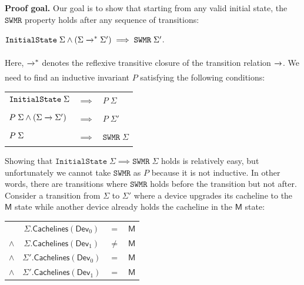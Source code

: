 \documentclass[10pt,conference]{IEEEtran}
\newcommand{\StateSymbol}{\Sigma}
\newcommand{\makestep}[2]{%
  \xrightarrow[%
    {\mathclap{\scriptscriptstyle
      \ifstrempty{#2}{}{#2}
    }}%
  ]{%
    {\mathclap{\scriptscriptstyle
      \ifstrempty{#1}{}{#1}
    }}%
  }%
}
\newcommand\SWMR{\texttt{SWMR}}
\newcommand\Modified{\STATE{M}}
\newcommand\STATE[1]{\textsf{#1}}
\begin{document}
\smallskip\noindent
\textbf{Proof goal.}
Our goal is to show that starting from any valid initial state, the $\SWMR$ property holds after any sequence of transitions:
\begin{center}
    $\texttt{InitialState} \; \StateSymbol{} \land (\StateSymbol{} \makestep{}{}^* \StateSymbol{}') \implies \SWMR\; \StateSymbol{}'$.
\end{center}
\noindent  Here, $\makestep{}{}^*$ denotes the reflexive transitive closure of the transition relation $\makestep{}{}$. 
We need to find an inductive invariant $P$ satisfying the following conditions:
\begin{center}
    \begin{tabular}{lcl}
        $\texttt{InitialState} \; \StateSymbol{}\vphantom{P \; \StateSymbol{} \land \StateSymbol{} \makestep{}{} \StateSymbol{}'}$ & $\implies$ & $P \; \StateSymbol{}$\\
        $P \; \StateSymbol{} \land (\StateSymbol{} \makestep{}{} \StateSymbol{}')$ & $ \implies$ & $P \; \StateSymbol{}'$ \\
        $P \; \StateSymbol{}\vphantom{P \; \StateSymbol{} \land \StateSymbol{} \makestep{}{} \StateSymbol{}'}$ & $\implies $ & $\SWMR\; \StateSymbol{}$
    \end{tabular}
\end{center}
\noindent
Showing that $\texttt{InitialState} \;\StateSymbol{} \implies \SWMR \; \StateSymbol{}$ holds is relatively easy, but unfortunately we cannot take $\SWMR$ as $P$ because it is not inductive. 
In other words, there are transitions where $\SWMR$ holds before the transition but not after.
Consider a transition from $\StateSymbol{}$ to $\StateSymbol{}'$ where a device upgrades its cacheline to the $\Modified$ state while another device already holds the cacheline in the $\Modified$ state:



\medskip
\begin{tabular}{cccc}
         & $\StateSymbol{}.\textsf{Cachelines}(\textsf{Dev}_0)$  & $=$    & $\Modified$ \\
$\wedge$ & $\StateSymbol{}.\textsf{Cachelines}(\textsf{Dev}_1)$  & $\neq$ & $\Modified$ \\
$\wedge$ & $\StateSymbol{}'.\textsf{Cachelines}(\textsf{Dev}_0)$ & $=$    & $\Modified$ \\
$\wedge$ & $\StateSymbol{}'.\textsf{Cachelines}(\textsf{Dev}_1)$ & $=$    & $\Modified$
\end{tabular}
\end{document}
